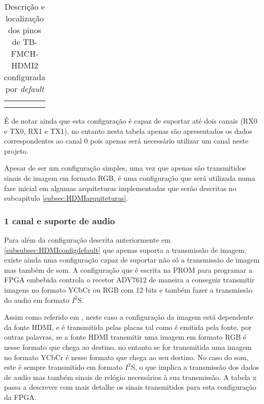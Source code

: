 \begin{table}[h!]
\begin{tabular}{|c|c|c|c|}
		&                                                                                       &                                                                                       &                                                                         \\
		&                                                                                       &                                                                                       &                                                                         \\ \hline
	\end{tabular}
	\caption{Descrição e localização dos pinos de TB-FMCH-HDMI2 configurada por \textit{default}}
	\label{table:HDMIdefaultSimplified}
\end{table}

É de notar ainda que esta configuração é capaz de suportar até dois canais (RX0 e TX0, RX1 e TX1), no entanto nesta tabela apenas são apresentados os dados correspondentes ao canal 0 pois apenas será necessário utilizar um canal neste projeto. 

Apesar de ser um configuração simples, uma vez que apenas são transmitidos sinais de imagem em formato RGB, é uma configuração que será utilizada numa fase inicial em algumas arquiteturas implementadas que serão descritas no subcapitulo \ref{subsec:HDMIarquiteturas}.

\subsubsection{1 canal e suporte de audio} \label {subsubsec:HDMIconfig+audio}

Para além da configuração descrita anteriormente em \ref{subsubsec:HDMIconfigdefault} que apenas suporta a transmissão de imagem, existe ainda uma configuração capaz de suportar não só a transmissão de imagem mas também de som. A configuração que é escrita na PROM para programar a FPGA embebida controla o recetor ADV7612 de maneira a conseguir transmitir imagens no formato YCbCr ou RGB com 12 bits e também fazer a transmissão do audio em formato $I^{2}$S.

Assim como referido em \cite{R014}, neste caso a configuração da imagem está dependente da fonte HDMI, e é transmitida pelas placas tal como é emitida pela fonte, por outras palavras, se a fonte HDMI transmitir uma imagem em formato RGB é nesse formato que chega ao destino, no entanto se for transmitida uma imagem no formato YCbCr é nesse formato que chega ao seu destino. No caso do som, este é sempre transmitido em formato $I^{2}$S, o que implica a transmissão dos dados de audio mas também sinais de relógio necessários à sua transmissão. A tabela x passa a descrever com mais detalhe os sinais transmitidos para esta configuração da FPGA.

